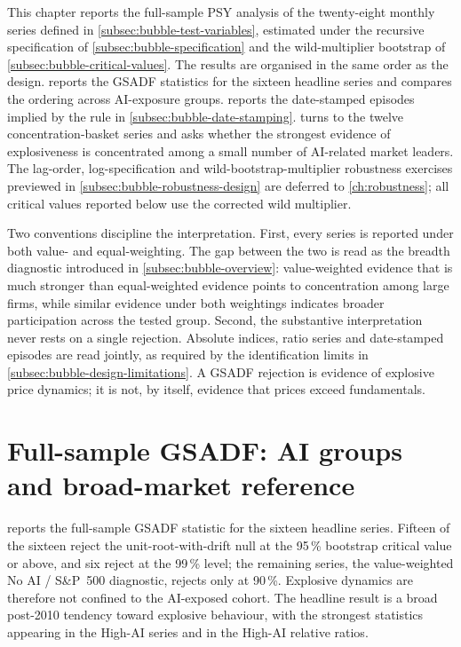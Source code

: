 This chapter reports the full-sample PSY analysis of the twenty-eight monthly series defined in \cref{subsec:bubble-test-variables}, estimated under the recursive specification of \cref{subsec:bubble-specification} and the wild-multiplier bootstrap of \cref{subsec:bubble-critical-values}. The results are organised in the same order as the design.  reports the GSADF statistics for the sixteen headline series and compares the ordering across AI-exposure groups.  reports the date-stamped episodes implied by the rule in \cref{subsec:bubble-date-stamping}.  turns to the twelve concentration-basket series and asks whether the strongest evidence of explosiveness is concentrated among a small number of AI-related market leaders. The lag-order, log-specification and wild-bootstrap-multiplier robustness exercises previewed in \cref{subsec:bubble-robustness-design} are deferred to \cref{ch:robustness}; all critical values reported below use the corrected wild multiplier.
 
Two conventions discipline the interpretation. First, every series is reported under both value- and equal-weighting. The gap between the two is read as the breadth diagnostic introduced in \cref{subsec:bubble-overview}: value-weighted evidence that is much stronger than equal-weighted evidence points to concentration among large firms, while similar evidence under both weightings indicates broader participation across the tested group. Second, the substantive interpretation never rests on a single rejection. Absolute indices, ratio series and date-stamped episodes are read jointly, as required by the identification limits in \cref{subsec:bubble-design-limitations}. A GSADF rejection is evidence of explosive price dynamics; it is not, by itself, evidence that prices exceed fundamentals.
 
\section{Full-sample GSADF: AI groups and broad-market reference}
\label{sec:results-headline}
 
 reports the full-sample GSADF statistic for the sixteen headline series. Fifteen of the sixteen reject the unit-root-with-drift null at the 95\,\% bootstrap critical value or above, and six reject at the 99\,\% level; the remaining series, the value-weighted No AI / S\&P~500 diagnostic, rejects only at 90\,\%. Explosive dynamics are therefore not confined to the AI-exposed cohort. The headline result is a broad post-2010 tendency toward explosive behaviour, with the strongest statistics appearing in the High-AI series and in the High-AI relative ratios.
 
